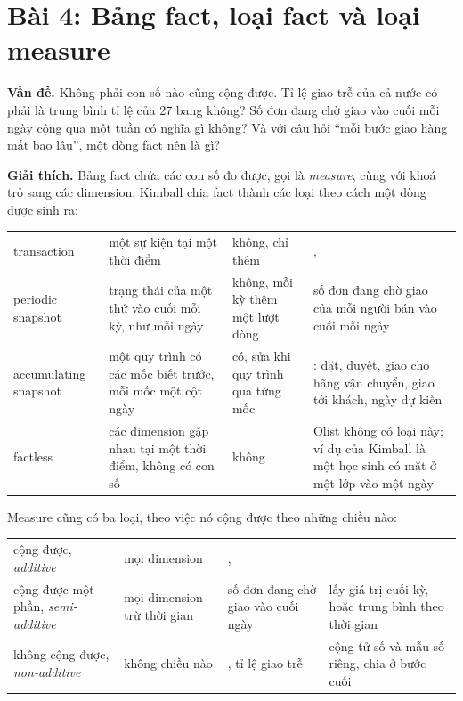\section{Bài 4: Bảng fact, loại fact và loại measure}

\textbf{Vấn đề.} Không phải con số nào cũng cộng được. Tỉ lệ giao trễ của cả nước có phải là trung bình tỉ lệ của 27 bang không? Số đơn đang chờ giao vào cuối mỗi ngày cộng qua một tuần có nghĩa gì không? Và với câu hỏi ``mỗi bước giao hàng mất bao lâu'', một dòng fact nên là gì?

\textbf{Giải thích.} Bảng fact chứa các con số đo được, gọi là \textit{measure}, cùng với khoá trỏ sang các dimension. Kimball chia fact thành các loại theo cách một dòng được sinh ra:

\begin{xltabular}{\textwidth}{@{}P{2.7cm} L P{2.6cm} L@{}}
\toprule
{} &  &  &  \\
\midrule
\endhead
\bottomrule
\endfoot
transaction & một sự kiện tại một thời điểm & không, chỉ thêm & ,  \\
periodic snapshot & trạng thái của một thứ vào cuối mỗi kỳ, như mỗi ngày & không, mỗi kỳ thêm một lượt dòng & số đơn đang chờ giao của mỗi người bán vào cuối mỗi ngày \\
accumulating snapshot & một quy trình có các mốc biết trước, mỗi mốc một cột ngày & có, sửa khi quy trình qua từng mốc & : đặt, duyệt, giao cho hãng vận chuyển, giao tới khách, ngày dự kiến \\
factless & các dimension gặp nhau tại một thời điểm, không có con số & không & Olist không có loại này; ví dụ của Kimball là một học sinh có mặt ở một lớp vào một ngày \\
\end{xltabular}

Measure cũng có ba loại, theo việc nó cộng được theo những chiều nào:

\begin{xltabular}{\textwidth}{@{}P{3.3cm} P{3.0cm} L L@{}}
\toprule
{} &  &  &  \\
\midrule
\endhead
\bottomrule
\endfoot
cộng được, \textit{additive} & mọi dimension & ,  &  \\
cộng được một phần, \textit{semi-additive} & mọi dimension trừ thời gian & số đơn đang chờ giao vào cuối ngày & lấy giá trị cuối kỳ, hoặc trung bình theo thời gian \\
không cộng được, \textit{non-additive} & không chiều nào & , tỉ lệ giao trễ & cộng tử số và mẫu số riêng, chia ở bước cuối \\
\end{xltabular}

